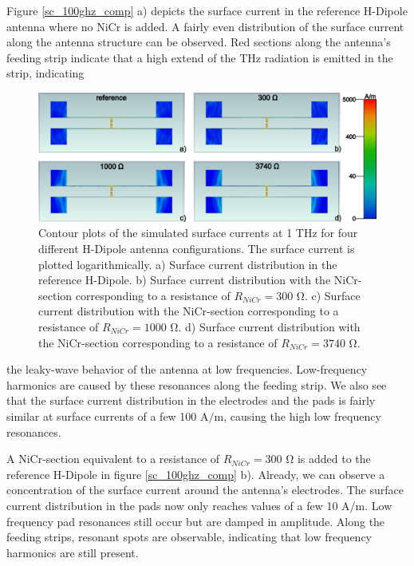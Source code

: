 Figure \ref{sc_100ghz_comp} a) depicts the surface current in the reference H-Dipole antenna where no NiCr is added. A fairly even distribution of the surface current along the antenna structure can be observed. Red sections along the antenna's feeding strip indicate that a high extend of the THz radiation is emitted in the strip, indicating
\begin{figure}[ht]
    \centering
    \includegraphics[width=\linewidth]{figures/Contour_Plots_v2/1Thz_SC_sim_plots.png}
    \caption{Contour plots of the simulated surface currents at \num{1} \si{\tera \hertz} for four different H-Dipole antenna configurations. The surface current is plotted logarithmically. a) Surface current distribution in the reference H-Dipole. b) Surface current distribution with the NiCr-section corresponding to a resistance of $R_{NiCr} = 300$ \si{\ohm}. c) Surface current distribution with the NiCr-section corresponding to a resistance of $R_{NiCr} = 1000$ \si{\ohm}. d) Surface current distribution with the NiCr-section corresponding to a resistance of $R_{NiCr} = 3740$ \si{\ohm}.}
    \label{sc_1thz_comp}
\end{figure}
the leaky-wave behavior of the antenna at low frequencies. Low-frequency harmonics are caused by these resonances along the feeding strip. We also see that the surface current distribution in the electrodes and the pads is fairly similar at surface currents of a few 100 A$/$m, causing the high low frequency resonances. 

A NiCr-section equivalent to a resistance of $R_{NiCr} = 300$ \si{\ohm} is added to the reference H-Dipole in figure \ref{sc_100ghz_comp} b). Already, we can observe a concentration of the surface current around the antenna's electrodes. The surface current distribution in the pads now only reaches values of a few 10 A$/$m. Low frequency pad resonances still occur but are damped in amplitude. Along the feeding strips, resonant spots are observable, indicating that low frequency harmonics are still present. 


